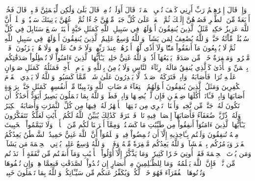 وَإِذۡ قَالَ إِبۡرَٰهِـۧمُ رَبِّ أَرِنِي كَيۡفَ تُحۡيِ ٱلۡمَوۡتَىٰۖ قَالَ أَوَلَمۡ تُؤۡمِنۖ قَالَ بَلَىٰ وَلَٰكِن لِّيَطۡمَئِنَّ قَلۡبِيۖ قَالَ فَخُذۡ أَرۡبَعَةٗ مِّنَ ٱلطَّيۡرِ فَصُرۡهُنَّ إِلَيۡكَ ثُمَّ ٱجۡعَلۡ عَلَىٰ كُلِّ جَبَلٖ مِّنۡهُنَّ جُزۡءٗا ثُمَّ ٱدۡعُهُنَّ يَأۡتِينَكَ سَعۡيٗاۚ وَٱعۡلَمۡ أَنَّ ٱللَّهَ عَزِيزٌ حَكِيمٞ
مَّثَلُ ٱلَّذِينَ يُنفِقُونَ أَمۡوَٰلَهُمۡ فِي سَبِيلِ ٱللَّهِ كَمَثَلِ حَبَّةٍ أَنۢبَتَتۡ سَبۡعَ سَنَابِلَ فِي كُلِّ سُنۢبُلَةٖ مِّاْئَةُ حَبَّةٖۗ وَٱللَّهُ يُضَٰعِفُ لِمَن يَشَآءُۚ وَٱللَّهُ وَٰسِعٌ عَلِيمٌ
ٱلَّذِينَ يُنفِقُونَ أَمۡوَٰلَهُمۡ فِي سَبِيلِ ٱللَّهِ ثُمَّ لَا يُتۡبِعُونَ مَآ أَنفَقُواْ مَنّٗا وَلَآ أَذٗى لَّهُمۡ أَجۡرُهُمۡ عِندَ رَبِّهِمۡ وَلَا خَوۡفٌ عَلَيۡهِمۡ وَلَا هُمۡ يَحۡزَنُونَ
۞قَوۡلٞ مَّعۡرُوفٞ وَمَغۡفِرَةٌ خَيۡرٞ مِّن صَدَقَةٖ يَتۡبَعُهَآ أَذٗىۗ وَٱللَّهُ غَنِيٌّ حَلِيمٞ
يَـٰٓأَيُّهَا ٱلَّذِينَ ءَامَنُواْ لَا تُبۡطِلُواْ صَدَقَٰتِكُم بِٱلۡمَنِّ وَٱلۡأَذَىٰ كَٱلَّذِي يُنفِقُ مَالَهُۥ رِئَآءَ ٱلنَّاسِ وَلَا يُؤۡمِنُ بِٱللَّهِ وَٱلۡيَوۡمِ ٱلۡأٓخِرِۖ فَمَثَلُهُۥ كَمَثَلِ صَفۡوَانٍ عَلَيۡهِ تُرَابٞ فَأَصَابَهُۥ وَابِلٞ فَتَرَكَهُۥ صَلۡدٗاۖ لَّا يَقۡدِرُونَ عَلَىٰ شَيۡءٖ مِّمَّا كَسَبُواْۗ وَٱللَّهُ لَا يَهۡدِي ٱلۡقَوۡمَ ٱلۡكَٰفِرِينَ
وَمَثَلُ ٱلَّذِينَ يُنفِقُونَ أَمۡوَٰلَهُمُ ٱبۡتِغَآءَ مَرۡضَاتِ ٱللَّهِ وَتَثۡبِيتٗا مِّنۡ أَنفُسِهِمۡ كَمَثَلِ جَنَّةِۭ بِرَبۡوَةٍ أَصَابَهَا وَابِلٞ فَـَٔاتَتۡ أُكُلَهَا ضِعۡفَيۡنِ فَإِن لَّمۡ يُصِبۡهَا وَابِلٞ فَطَلّٞۗ وَٱللَّهُ بِمَا تَعۡمَلُونَ بَصِيرٌ
أَيَوَدُّ أَحَدُكُمۡ أَن تَكُونَ لَهُۥ جَنَّةٞ مِّن نَّخِيلٖ وَأَعۡنَابٖ تَجۡرِي مِن تَحۡتِهَا ٱلۡأَنۡهَٰرُ لَهُۥ فِيهَا مِن كُلِّ ٱلثَّمَرَٰتِ وَأَصَابَهُ ٱلۡكِبَرُ وَلَهُۥ ذُرِّيَّةٞ ضُعَفَآءُ فَأَصَابَهَآ إِعۡصَارٞ فِيهِ نَارٞ فَٱحۡتَرَقَتۡۗ كَذَٰلِكَ يُبَيِّنُ ٱللَّهُ لَكُمُ ٱلۡأٓيَٰتِ لَعَلَّكُمۡ تَتَفَكَّرُونَ
يَـٰٓأَيُّهَا ٱلَّذِينَ ءَامَنُوٓاْ أَنفِقُواْ مِن طَيِّبَٰتِ مَا كَسَبۡتُمۡ وَمِمَّآ أَخۡرَجۡنَا لَكُم مِّنَ ٱلۡأَرۡضِۖ وَلَا تَيَمَّمُواْ ٱلۡخَبِيثَ مِنۡهُ تُنفِقُونَ وَلَسۡتُم بِـَٔاخِذِيهِ إِلَّآ أَن تُغۡمِضُواْ فِيهِۚ وَٱعۡلَمُوٓاْ أَنَّ ٱللَّهَ غَنِيٌّ حَمِيدٌ
ٱلشَّيۡطَٰنُ يَعِدُكُمُ ٱلۡفَقۡرَ وَيَأۡمُرُكُم بِٱلۡفَحۡشَآءِۖ وَٱللَّهُ يَعِدُكُم مَّغۡفِرَةٗ مِّنۡهُ وَفَضۡلٗاۗ وَٱللَّهُ وَٰسِعٌ عَلِيمٞ
يُؤۡتِي ٱلۡحِكۡمَةَ مَن يَشَآءُۚ وَمَن يُؤۡتَ ٱلۡحِكۡمَةَ فَقَدۡ أُوتِيَ خَيۡرٗا كَثِيرٗاۗ وَمَا يَذَّكَّرُ إِلَّآ أُوْلُواْ ٱلۡأَلۡبَٰبِ
وَمَآ أَنفَقۡتُم مِّن نَّفَقَةٍ أَوۡ نَذَرۡتُم مِّن نَّذۡرٖ فَإِنَّ ٱللَّهَ يَعۡلَمُهُۥۗ وَمَا لِلظَّـٰلِمِينَ مِنۡ أَنصَارٍ
إِن تُبۡدُواْ ٱلصَّدَقَٰتِ فَنِعِمَّا هِيَۖ وَإِن تُخۡفُوهَا وَتُؤۡتُوهَا ٱلۡفُقَرَآءَ فَهُوَ خَيۡرٞ لَّكُمۡۚ وَيُكَفِّرُ عَنكُم مِّن سَيِّـَٔاتِكُمۡۗ وَٱللَّهُ بِمَا تَعۡمَلُونَ خَبِيرٞ
